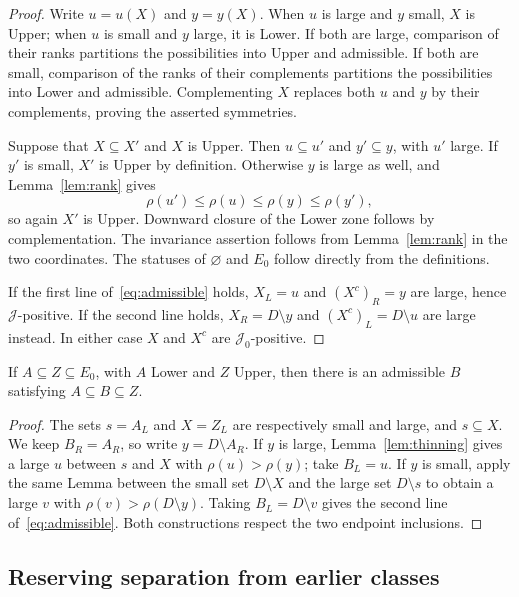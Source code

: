 \begin{proof}
Write $u=u(X)$ and $y=y(X)$.
When $u$ is large and $y$ small, $X$ is Upper; when $u$ is small and $y$
large, it is Lower.
If both are large, comparison of their ranks partitions the possibilities
into Upper and admissible.
If both are small, comparison of the ranks of their complements partitions
the possibilities into Lower and admissible.
Complementing $X$ replaces both $u$ and $y$ by their complements, proving
the asserted symmetries.

Suppose that $X\subseteq X'$ and $X$ is Upper.
Then $u\subseteq u'$ and $y'\subseteq y$, with $u'$ large.
If $y'$ is small, $X'$ is Upper by definition.
Otherwise $y$ is large as well, and Lemma~\ref{lem:rank} gives
\[
 \rho(u')\le\rho(u)\le\rho(y)\le\rho(y'),
\]
so again $X'$ is Upper.
Downward closure of the Lower zone follows by complementation.
The invariance assertion follows from Lemma~\ref{lem:rank} in the two
coordinates.
The statuses of $\varnothing$ and $E_0$ follow directly from the definitions.

If the first line of~\eqref{eq:admissible} holds, $X_L=u$ and
$(X^c)_R=y$ are large, hence $\mathcal J$-positive.
If the second line holds, $X_R=D\setminus y$ and
$(X^c)_L=D\setminus u$ are large instead.
In either case $X$ and $X^c$ are $\mathcal J_0$-positive.
\end{proof}

\begin{lemma}\label{lem:zone-crossing}
If $A\subseteq Z\subseteq E_0$, with $A$ Lower and $Z$ Upper, then
there is an admissible $B$ satisfying $A\subseteq B\subseteq Z$.
\end{lemma}

\begin{proof}
The sets $s=A_L$ and $X=Z_L$ are respectively small and large, and
$s\subseteq X$.
We keep $B_R=A_R$, so write $y=D\setminus A_R$.
If $y$ is large, Lemma~\ref{lem:thinning} gives a large $u$ between
$s$ and $X$ with $\rho(u)>\rho(y)$; take $B_L=u$.
If $y$ is small, apply the same Lemma between the small set
$D\setminus X$ and the large set $D\setminus s$ to obtain a large $v$
with $\rho(v)>\rho(D\setminus y)$.
Taking $B_L=D\setminus v$ gives the second line
of~\eqref{eq:admissible}.
Both constructions respect the two endpoint inclusions.
\end{proof}

\subsection{Reserving separation from earlier classes}

